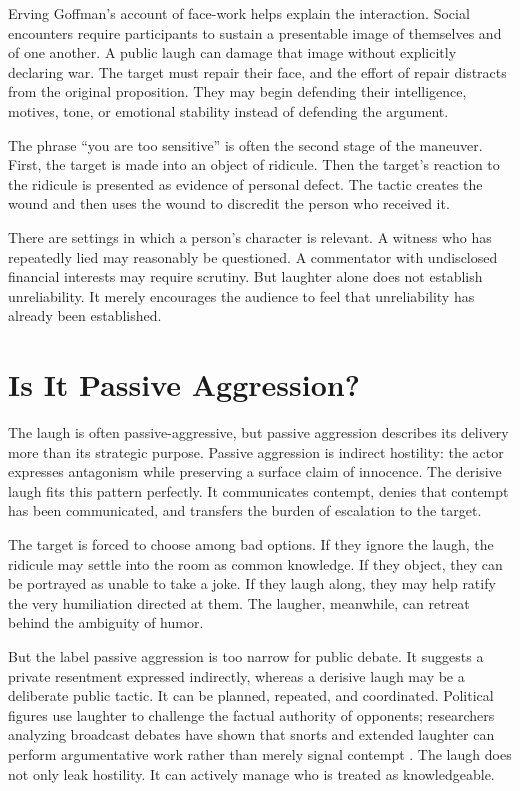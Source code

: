 ﻿\documentclass[12pt,a4paper]{book}
\begin{document}
Erving Goffman's account of face-work helps explain the interaction. Social encounters require participants to sustain a presentable image of themselves and of one another. A public laugh can damage that image without explicitly declaring war. The target must repair their face, and the effort of repair distracts from the original proposition. They may begin defending their intelligence, motives, tone, or emotional stability instead of defending the argument.

The phrase ``you are too sensitive'' is often the second stage of the maneuver. First, the target is made into an object of ridicule. Then the target's reaction to the ridicule is presented as evidence of personal defect. The tactic creates the wound and then uses the wound to discredit the person who received it.

There are settings in which a person's character is relevant. A witness who has repeatedly lied may reasonably be questioned. A commentator with undisclosed financial interests may require scrutiny. But laughter alone does not establish unreliability. It merely encourages the audience to feel that unreliability has already been established.

\section{Is It Passive Aggression?}

The laugh is often passive-aggressive, but passive aggression describes its delivery more than its strategic purpose. Passive aggression is indirect hostility: the actor expresses antagonism while preserving a surface claim of innocence. The derisive laugh fits this pattern perfectly. It communicates contempt, denies that contempt has been communicated, and transfers the burden of escalation to the target.

The target is forced to choose among bad options. If they ignore the laugh, the ridicule may settle into the room as common knowledge. If they object, they can be portrayed as unable to take a joke. If they laugh along, they may help ratify the very humiliation directed at them. The laugher, meanwhile, can retreat behind the ambiguity of humor.

But the label passive aggression is too narrow for public debate. It suggests a private resentment expressed indirectly, whereas a derisive laugh may be a deliberate public tactic. It can be planned, repeated, and coordinated. Political figures use laughter to challenge the factual authority of opponents; researchers analyzing broadcast debates have shown that snorts and extended laughter can perform argumentative work rather than merely signal contempt \cite{demasi2019}. The laugh does not only leak hostility. It can actively manage who is treated as knowledgeable.
\end{document}
